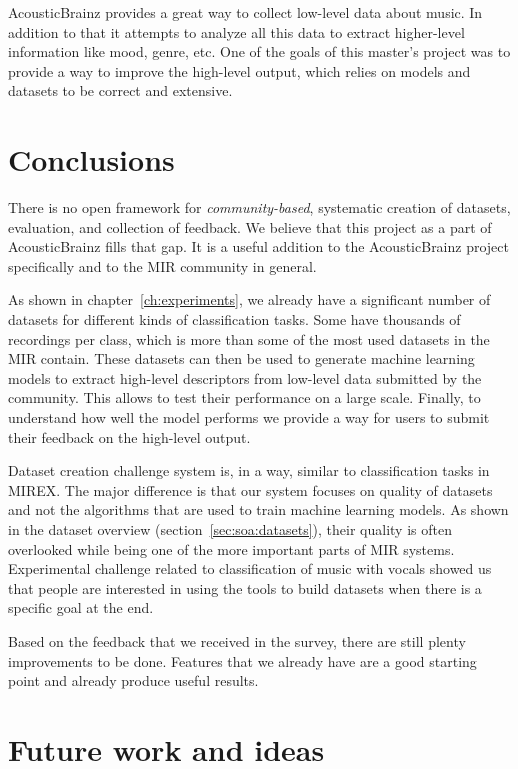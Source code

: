 AcousticBrainz provides a great way to collect low-level data about music. In addition to that it attempts to analyze all this data to extract higher-level information like mood, genre, etc. One of the goals of this master's project was to provide a way to improve the high-level output, which relies on models and datasets to be correct and extensive.


\section{Conclusions}

There is no open framework for \emph{community-based}, systematic creation of datasets, evaluation, and collection of feedback. We believe that this project as a part of AcousticBrainz fills that gap. It is a useful addition to the AcousticBrainz project specifically and to the MIR community in general.

As shown in chapter~\ref{ch:experiments}, we already have a significant number of datasets for different kinds of classification tasks. Some have thousands of recordings per class, which is more than some of the most used datasets in the MIR contain. These datasets can then be used to generate machine learning models to extract high-level descriptors from low-level data submitted by the community. This allows to test their performance on a large scale. Finally, to understand how well the model performs we provide a way for users to submit their feedback on the high-level output.

Dataset creation challenge system is, in a way, similar to classification tasks in MIREX. The major difference is that our system focuses on quality of datasets and not the algorithms that are used to train machine learning models. As shown in the dataset overview (section~\ref{sec:soa:datasets}), their quality is often overlooked while being one of the more important parts of MIR systems. Experimental challenge related to classification of music with vocals showed us that people are interested in using the tools to build datasets when there is a specific goal at the end.

Based on the feedback that we received in the survey, there are still plenty improvements to be done. Features that we already have are a good starting point and already produce useful results.


\section{Future work and ideas}

